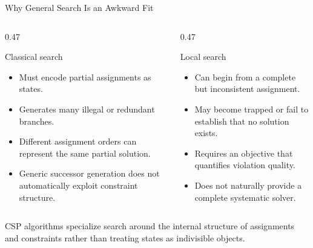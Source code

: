 \documentclass[aspectratio=169,10pt]{beamer}
\begin{document}
\begin{frame}[shrink=20]{Why General Search Is an Awkward Fit}
  \begin{columns}[T,onlytextwidth]
    \begin{column}{0.47\textwidth}
      \begin{block}{Classical search}
        \begin{itemize}
          \item Must encode partial assignments as states.
          \item Generates many illegal or redundant branches.
          \item Different assignment orders can represent the same partial solution.
          \item Generic successor generation does not automatically exploit constraint structure.
        \end{itemize}
      \end{block}
    \end{column}

    \begin{column}{0.47\textwidth}
      \begin{block}{Local search}
        \begin{itemize}
          \item Can begin from a complete but inconsistent assignment.
          \item May become trapped or fail to establish that no solution exists.
          \item Requires an objective that quantifies violation quality.
          \item Does not naturally provide a complete systematic solver.
        \end{itemize}
      \end{block}
    \end{column}
  \end{columns}

  \begin{keyidea}
    CSP algorithms specialize search around the internal structure of assignments and constraints rather than treating states as indivisible objects.
  \end{keyidea}
\end{frame}
\end{document}
